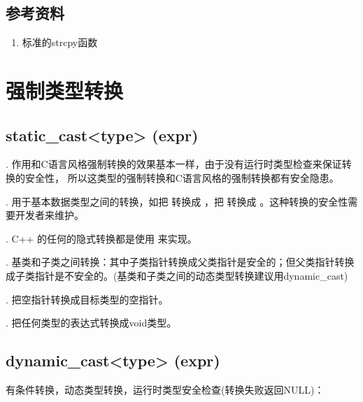 \documentclass[letterpaper,10pt,english]{sphinxmanual}
\begin{document}
\subsection{参考资料}
\label{\detokenize{cpp/09_strcpy:id2}}\begin{enumerate}
\item {} 
标准的strcpy函数

\end{enumerate}
\begin{quote}

\end{quote}


\section{强制类型转换}
\label{\detokenize{cpp/10_cast::doc}}\label{\detokenize{cpp/10_cast:id1}}

\subsection{static\_cast\textless{}type\textgreater{} (expr)}
\label{\detokenize{cpp/10_cast:static-cast-type-expr}}
.  作用和C语言风格强制转换的效果基本一样，由于没有运行时类型检查来保证转换的安全性，
所以这类型的强制转换和C语言风格的强制转换都有安全隐患。

. 用于基本数据类型之间的转换，如把  转换成  ，把  转换成  。这种转换的安全性需要开发者来维护。

. C++ 的任何的隐式转换都是使用  来实现。

. 基类和子类之间转换：其中子类指针转换成父类指针是安全的；但父类指针转换成子类指针是不安全的。(基类和子类之间的动态类型转换建议用dynamic\_cast)

. 把空指针转换成目标类型的空指针。

. 把任何类型的表达式转换成void类型。


\subsection{dynamic\_cast\textless{}type\textgreater{} (expr)}
\label{\detokenize{cpp/10_cast:dynamic-cast-type-expr}}
有条件转换，动态类型转换，运行时类型安全检查(转换失败返回NULL)：
\end{document}
